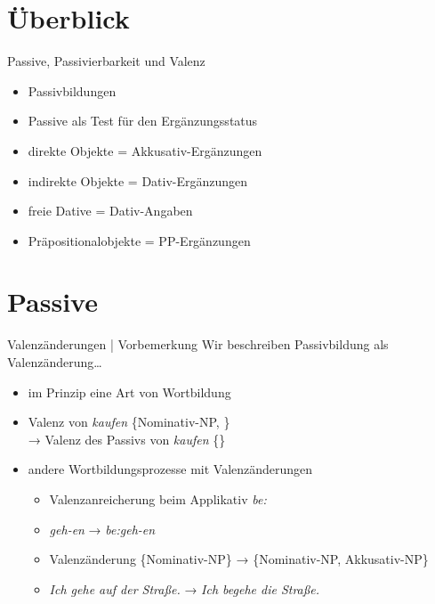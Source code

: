 
\section{Überblick}

\begin{frame}
  {Passive, Passivierbarkeit und Valenz}
  \begin{itemize}[<+->]
    \item Passivbildungen
    \item Passive als Test für den Ergänzungsstatus
      \Halbzeile
    \item direkte Objekte = Akkusativ-Ergänzungen
    \item indirekte Objekte = Dativ-Ergänzungen
    \item freie Dative = Dativ-Angaben
    \item Präpositionalobjekte = PP-Ergänzungen
  \end{itemize}
\end{frame}

\section{Passive}

\begin{frame}
  {Valenzänderungen | Vorbemerkung}
  \onslide<+->
  \onslide<+->
  \alert{Wir beschreiben Passivbildung als Valenzänderung\ldots}\\
  \Halbzeile
  \begin{itemize}[<+->]
    \item im Prinzip eine Art von \alert{Wortbildung}
    \item Valenz von \textit{kaufen} \{\alert{Nominativ-NP}, \}\\
      → Valenz des Passivs von \textit{kaufen} \{\}
      \Halbzeile
    \item andere Wortbildungsprozesse mit Valenzänderungen
      \begin{itemize}[<+->]
        \item Valenzanreicherung beim Applikativ \textit{be:}
        \item \textit{geh-en} → \textit{be:geh-en}
        \item Valenzänderung \{Nominativ-NP\} → \{Nominativ-NP, Akkusativ-NP\}
        \item \textit{Ich gehe auf der Straße.} → \textit{Ich begehe die Straße.}
      \end{itemize}
  \end{itemize}
\end{frame}

